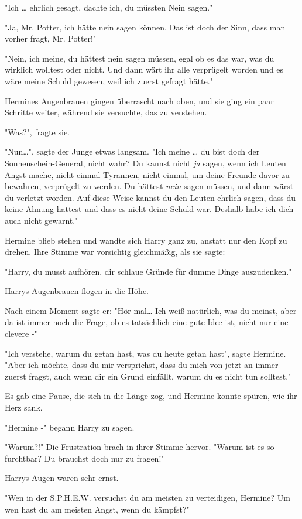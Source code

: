{"Ich … ehrlich gesagt, dachte ich, du müssten Nein sagen."

"Ja, Mr. Potter, ich hätte nein sagen können. Das ist doch der Sinn, dass man vorher fragt, Mr. Potter!"

"Nein, ich meine, du hättest nein sagen müssen, egal ob es das war, was du wirklich wolltest oder nicht. Und dann wärt ihr alle verprügelt worden und es wäre meine Schuld gewesen, weil ich zuerst gefragt hätte."

Hermines Augenbrauen gingen überrascht nach oben, und sie ging ein paar Schritte weiter, während sie versuchte, das zu verstehen.

"Was?", fragte sie.

"Nun…", sagte der Junge etwas langsam. "Ich meine … du bist doch der Sonnenschein-General, nicht wahr? Du kannst nicht \emph{ja} sagen, wenn ich Leuten Angst mache, nicht einmal Tyrannen, nicht einmal, um deine Freunde davor zu bewahren, verprügelt zu werden. Du hättest \emph{nein} sagen müssen, und dann wärst du verletzt worden. Auf diese Weise kannst du den Leuten ehrlich sagen, dass du keine Ahnung hattest und dass es nicht deine Schuld war. Deshalb habe ich dich auch nicht gewarnt."

Hermine blieb stehen und wandte sich Harry ganz zu, anstatt nur den Kopf zu drehen. Ihre Stimme war vorsichtig gleichmäßig, als sie sagte:

"Harry, du musst aufhören, dir schlaue Gründe für dumme Dinge auszudenken."

Harrys Augenbrauen flogen in die Höhe.

Nach einem Moment sagte er: "Hör mal… Ich weiß natürlich, was du meinst, aber da ist immer noch die Frage, ob es tatsächlich eine gute Idee ist, nicht nur eine clevere -"

"Ich verstehe, warum du getan hast, was du heute getan hast", sagte Hermine. "Aber ich möchte, dass du mir versprichst, dass du mich von jetzt an immer zuerst fragst, auch wenn dir ein Grund einfällt, warum du es nicht tun solltest."

Es gab eine Pause, die sich in die Länge zog, und Hermine konnte spüren, wie ihr Herz sank.

"Hermine -" begann Harry zu sagen.

"Warum?!" Die Frustration brach in ihrer Stimme hervor. "Warum ist es so furchtbar? Du brauchst doch nur zu fragen!"

Harrys Augen waren sehr ernst.

"Wen in der S.P.H.E.W. versuchst du am meisten zu verteidigen, Hermine? Um wen hast du am meisten Angst, wenn du kämpfst?"

}
